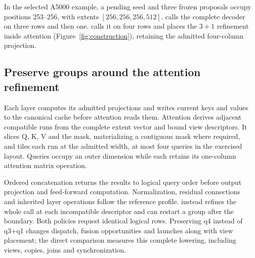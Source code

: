 In the selected A5000 example, a pending seed and three frozen proposals occupy positions 253--256, with extents $[256,256,256,512]$. \Simple{} calls the complete decoder on three rows and then one. \Local{} calls it on four rows and places the $3+1$ refinement inside attention (Figure~\ref{fig:construction}), retaining the admitted four-column projection.


\subsection{Preserve groups around the attention refinement}
Each layer computes its admitted projections and writes current keys and values to the canonical cache before attention reads them. Attention derives adjacent compatible runs from the complete extent vector and bound view descriptors. It slices Q, K, V and the mask, materializing a contiguous mask where required, and tiles each run at the admitted width, at most four queries in the exercised layout. Queries occupy an outer dimension while each retains its one-column attention matrix operation.

Ordered concatenation returns the results to logical query order before output projection and feed-forward computation. Normalization, residual connections and inherited layer operations follow the reference profile. \Simple{} instead refines the whole call at each incompatible descriptor and can restart a group after the boundary. Both policies request identical logical rows. Preserving q4 instead of q3+q1 changes dispatch, fusion opportunities and launches along with view placement; the direct comparison measures this complete lowering, including views, copies, joins and synchronization.

